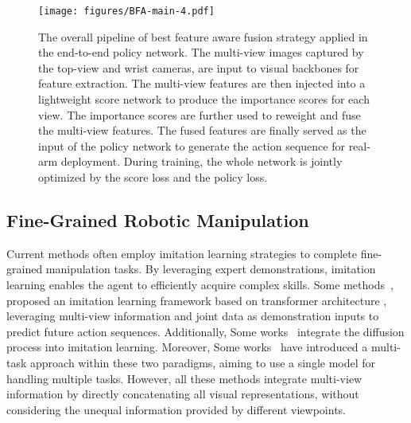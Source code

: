 \begin{figure*}[htbp]
    \centering
    \texttt{[image: figures/BFA-main-4.pdf]}
    \vspace{-0.8cm}
    \caption{The overall pipeline of best feature aware fusion strategy applied in the end-to-end policy network. The multi-view images captured by the top-view and wrist cameras, are input to visual backbones for feature extraction. The multi-view features are then injected into a lightweight score network to produce the importance scores for each view. The importance scores are further used to reweight and fuse the multi-view features. The fused features are finally served as the input of the policy network to generate the action sequence for real-arm deployment. During training, the whole network is jointly optimized by the score loss and the policy loss.}
    \label{fig:BFA-main}
\end{figure*}



\subsection{Fine-Grained Robotic Manipulation}
Current methods often employ imitation learning strategies to complete fine-grained manipulation tasks. By leveraging expert demonstrations, imitation learning enables the agent to efficiently acquire complex skills.
Some methods~\cite{AcT,rvt,rvt-2}, proposed an imitation learning framework based on transformer architecture \cite{VaswaniAttention2017}, leveraging multi-view information and joint data as demonstration inputs to predict future action sequences. Additionally, Some works~\cite{ChiDP2023,Ze2024DP3,zhao2024aloha} integrate the diffusion process into imitation learning. Moreover, Some works~\cite{bharadhwaj2024roboagent,haldar2024baku,ma2024hierarchical} have introduced a multi-task approach within these two paradigms, aiming to use a single model for handling multiple tasks.
However, all these methods integrate multi-view information by directly concatenating all visual representations, without considering the unequal information provided by different viewpoints.


